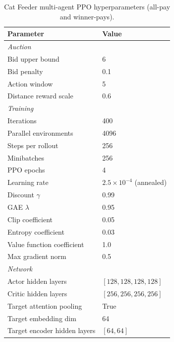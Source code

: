 \begin{table}[h]
\centering
\begin{tabular}{ll}
\toprule
Parameter & Value \\
\midrule
\multicolumn{2}{l}{\textit{Auction}} \\
Bid upper bound & 6 \\
Bid penalty & 0.1 \\
Action window & 5 \\
Distance reward scale & 0.6 \\
\midrule
\multicolumn{2}{l}{\textit{Training}} \\
Iterations & 400 \\
Parallel environments & 4096 \\
Steps per rollout & 256 \\
Minibatches & 256 \\
PPO epochs & 4 \\
Learning rate & $2.5 \times 10^{-4}$ (annealed) \\
Discount $\gamma$ & 0.99 \\
GAE $\lambda$ & 0.95 \\
Clip coefficient & 0.05 \\
Entropy coefficient & 0.03 \\
Value function coefficient & 1.0 \\
Max gradient norm & 0.5 \\
\midrule
\multicolumn{2}{l}{\textit{Network}} \\
Actor hidden layers & $[128, 128, 128, 128]$ \\
Critic hidden layers & $[256, 256, 256, 256]$ \\
Target attention pooling & True \\
Target embedding dim & 64 \\
Target encoder hidden layers & $[64, 64]$ \\
\bottomrule
\end{tabular}
\caption{Cat Feeder multi-agent PPO hyperparameters (all-pay and winner-pays).}
\end{table}

